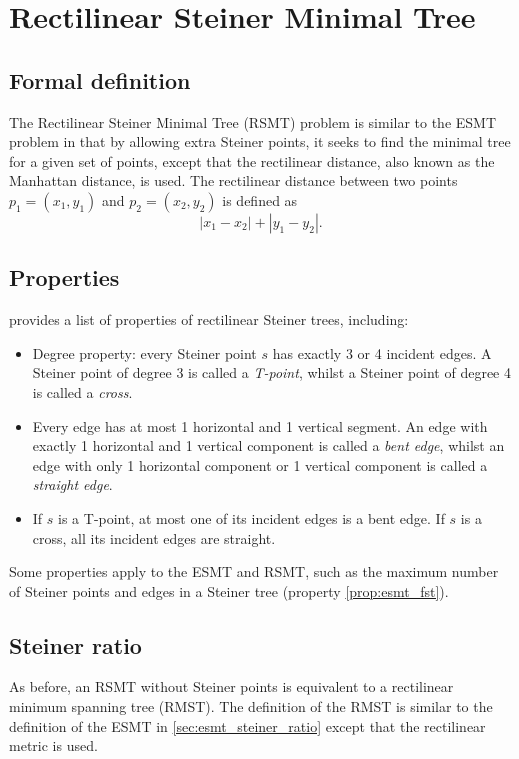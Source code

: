 \documentclass{l4proj}
\begin{document}
\section{Rectilinear Steiner Minimal Tree}
\subsection{Formal definition}
The Rectilinear Steiner Minimal Tree (RSMT) problem is similar to the ESMT problem in that by allowing extra Steiner points, it seeks to find the minimal tree for a given set of points, except that the rectilinear distance, also known as the Manhattan distance, is used. The rectilinear distance between two points $p_1 = (x_1, y_1)$ and $p_2 = (x_2, y_2)$ is defined as
$$|x_1 - x_2| + |y_1 - y_2|.$$
\subsection{Properties}
\cite{Brazil2015} provides a list of properties of rectilinear Steiner trees, including:

\begin{itemize}
    \item Degree property: every Steiner point $s$ has exactly 3 or 4 incident edges. A Steiner point of degree 3 is called a \textit{T-point}, whilst a Steiner point of degree 4 is called a \textit{cross}.
    \item Every edge has at most 1 horizontal and 1 vertical segment. An edge with exactly 1 horizontal and 1 vertical component is called a \textit{bent edge}, whilst an edge with only 1 horizontal component or 1 vertical component is called a \textit{straight edge}.
    \item If $s$ is a T-point, at most one of its incident edges is a bent edge. If $s$ is a cross, all its incident edges are straight.
\end{itemize}
\label{sec:rsmt_properties}
Some properties apply to the ESMT and RSMT, such as the maximum number of Steiner points and edges in a Steiner tree (property \ref{prop:esmt_fst}).

\subsection{Steiner ratio}
As before, an RSMT without Steiner points is equivalent to a rectilinear minimum spanning tree (RMST). The definition of the RMST is similar to the definition of the ESMT in \ref{sec:esmt_steiner_ratio} except that the rectilinear metric is used.
\end{document}
